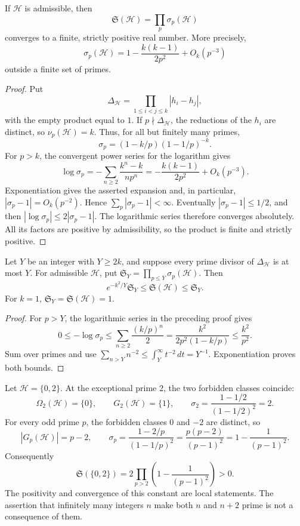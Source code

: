 \documentclass[11pt]{article}
\begin{document}
\begin{theorem}
If $\mathcal H$ is admissible, then
\[
 \mathfrak S(\mathcal H)=\prod_p\sigma_p(\mathcal H)
\]
converges to a finite, strictly positive real number.  More precisely,
\[
 \sigma_p(\mathcal H)=1-\frac{k(k-1)}{2p^2}+O_k(p^{-3})
\]
outside a finite set of primes.
\end{theorem}

\begin{proof}
Put
\[
 \Delta_{\mathcal H}=\prod_{1\leq i<j\leq k}|h_i-h_j|,
\]
with the empty product equal to $1$.  If $p\nmid\Delta_{\mathcal H}$, the
reductions of the $h_i$ are distinct, so $\nu_p(\mathcal H)=k$.  Thus, for all
but finitely many primes,
\[
 \sigma_p=(1-k/p)(1-1/p)^{-k}.
\]
For $p>k$, the convergent power series for the logarithm gives
\[
 \log\sigma_p
 =-\sum_{n\geq2}\frac{k^n-k}{n p^n}
 =-\frac{k(k-1)}{2p^2}+O_k(p^{-3}).
\]
Exponentiation gives the asserted expansion and, in particular,
$|\sigma_p-1|=O_k(p^{-2})$.  Hence
$\sum_p|\sigma_p-1|<\infty$.  Eventually $|\sigma_p-1|\leq1/2$, and then
$|\log\sigma_p|\leq2|\sigma_p-1|$.  The logarithmic series therefore
converges absolutely.  All its factors are positive by admissibility, so the
product is finite and strictly positive.
\end{proof}

\begin{corollary}\label{cor:product-tail}
Let $Y$ be an integer with $Y\geq2k$, and suppose every prime divisor of
$\Delta_{\mathcal H}$ is at most $Y$.  For admissible $\mathcal H$, put
$\mathfrak S_Y=\prod_{p\leq Y}\sigma_p(\mathcal H)$.  Then
\[
 e^{-k^2/Y}\mathfrak S_Y\leq\mathfrak S(\mathcal H)
 \leq\mathfrak S_Y.
\]
For $k=1$, $\mathfrak S_Y=\mathfrak S(\mathcal H)=1$.
\end{corollary}

\begin{proof}
For $p>Y$, the logarithmic series in the preceding proof gives
\[
 0\leq-\log\sigma_p
 \leq\sum_{n\geq2}\frac{(k/p)^n}{2}
 =\frac{k^2}{2p^2(1-k/p)}\leq\frac{k^2}{p^2}.
\]
Sum over primes and use
$\sum_{n>Y}n^{-2}\leq\int_Y^\infty t^{-2}\,dt=Y^{-1}$.
Exponentiation proves both bounds.
\end{proof}

\begin{example}
Let $\mathcal H=\{0,2\}$.  At the exceptional prime $2$, the two forbidden
classes coincide:
\[
 \Omega_2(\mathcal H)=\{0\},\qquad
 G_2(\mathcal H)=\{1\},\qquad
 \sigma_2=\frac{1-1/2}{(1-1/2)^2}=2.
\]
For every odd prime $p$, the forbidden classes $0$ and $-2$ are distinct, so
\[
 |G_p(\mathcal H)|=p-2,
 \qquad
 \sigma_p=\frac{1-2/p}{(1-1/p)^2}
 =\frac{p(p-2)}{(p-1)^2}
 =1-\frac{1}{(p-1)^2}.
\]
Consequently
\[
 \mathfrak S(\{0,2\})
 =2\prod_{p>2}\left(1-\frac{1}{(p-1)^2}\right)>0.
\]
The positivity and convergence of this constant are local statements.  The
assertion that infinitely many integers $n$ make both $n$ and $n+2$ prime is
not a consequence of them.
\end{example}
\end{document}
